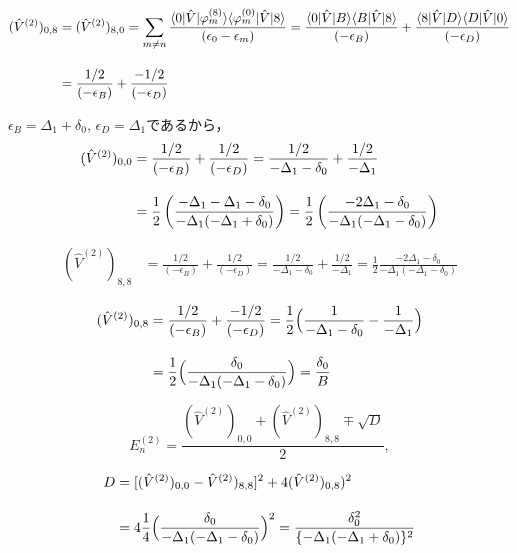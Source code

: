 \begin{align}
    (\hat{V}^{(2)})_{0,8}
    &=(\hat{V}^{(2)})_{8,0}
    =\sum_{m\neq n}
    \frac{\langle{0|\hat{V}|\varphi^{(8)}_m}\rangle
    \langle{\varphi^{(0)}_{m}|\hat{V}|8}\rangle}
    {(\epsilon_0-\epsilon_m)}
    =
    \frac{\langle{0|\hat{V}|B}\rangle
    \langle{B|\hat{V}|8}\rangle}
    {(-\epsilon_B)}
    +\frac{\langle{8|\hat{V}|D}\rangle
    \langle{D|\hat{V}|0}\rangle}
    {(-\epsilon_D)}\nn[10pt]
    & =
    \frac{1/2}
    {(-\epsilon_B)}
    +\frac{-1/2}
    {(-\epsilon_D)}
\end{align}





$\epsilon_B = \Delta_1 + \delta_0$, $\epsilon_D=\Delta_1$であるから，
\begin{align}
    (\hat{V}^{(2)})_{0,0}
    &
    =\frac{1 / 2}
    {(-\epsilon_B)}
    +\frac{1 / 2}
    {(-\epsilon_D)}
    =\frac{1/2}
    {-\Delta_1 - \delta_0}
    +\frac{1/2}
    {-\Delta_1}\nn[10pt]
    &
    =\frac{1}{2}
    \left(
    \frac{-\Delta_1-\Delta_1 - \delta_0}{-\Delta_1(-\Delta_1 + \delta_0)}
    \right)
    =\frac{1}{2}
    \left(\frac{-2\Delta_1 - \delta_0}{-\Delta_1(-\Delta_1 - \delta_0)}
    \right)
\end{align}


\begin{align}
    (\hat{V}^{(2)})_{8,8}
    &
    =\frac{1 / 2}
    {(-\epsilon_B)}
    +\frac{1 / 2}
    {(-\epsilon_D)}
    =\frac{1 / 2}
    {-\Delta_1 - \delta_0}
    +\frac{1 / 2}
    {-\Delta_1}
    =\frac{1}{2}\frac{-2\Delta_1 - \delta_0}{-\Delta_1(-\Delta_1 - \delta_0)}
\end{align}




\begin{align}
    (\hat{V}^{(2)})_{0,8}
    & =
    \frac{1/2}
    {(-\epsilon_B)}
    +\frac{-1/2}
    {(-\epsilon_D)}
    =\frac{1}{2}
    \Bigl(
    \frac{1}
    {-\Delta_1 - \delta_0}
    -\frac{1}
    {-\Delta_1}
    \Bigr)
    \nn[10pt]
    &=\frac{1}{2}
    \Bigl(
    \frac{\delta_0}
    {-\Delta_1(-\Delta_1 - \delta_0)}
    \Bigr)
    =\frac{\delta_0}{B}
\end{align}


\begin{equation}
    E^{(2)}_n=\frac{
    (\hat{V}^{(2)})_{0,0} + (\hat{V}^{(2)})_{8,8}
    \mp \sqrt{D}
    }{2},
\end{equation}

\begin{align}
    D&=[(\hat{V}^{(2)})_{0,0} - \hat{V}^{(2)})_{8,8}]^2 + 4(\hat{V}^{(2)})_{0,8})^2\nn[10pt]
    &=4\frac{1}{4}\Bigl(
    \frac{\delta_0}
    {-\Delta_1(-\Delta_1 - \delta_0)}
    \Bigr)^2
    =\frac{\delta_0^2}
    {\{-\Delta_1(-\Delta_1 + \delta_0)\}^2}
\end{align}

